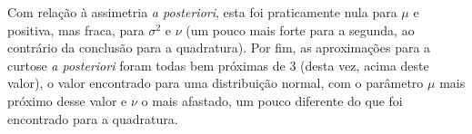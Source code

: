 Com relação à assimetria \textit{a posteriori}, esta foi praticamente nula para $\mu$ e positiva, mas fraca, para $\sigma^2$ e $\nu$ (um pouco mais forte para a segunda, ao contrário da conclusão para a quadratura). Por fim, as aproximações para a curtose \textit{a posteriori} foram todas bem próximas de 3 (desta vez, acima deste valor), o valor encontrado para uma distribuição normal, com o parâmetro $\mu$ mais próximo desse valor e $\nu$ o mais afastado, um pouco diferente do que foi encontrado para a quadratura.